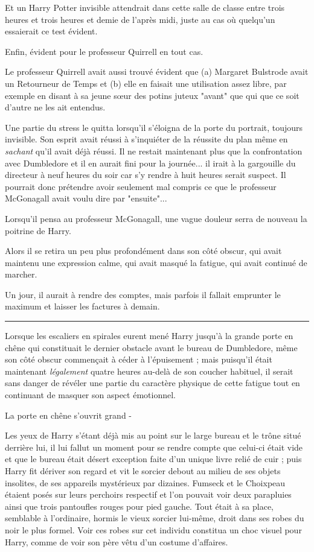 Et un Harry Potter invisible attendrait dans cette salle de classe entre trois heures et trois heures et demie de l'après midi, juste au cas où quelqu'un essaierait ce test évident.

Enfin, évident pour le professeur Quirrell en tout cas.

Le professeur Quirrell avait aussi trouvé évident que (a) Margaret Bulstrode avait un Retourneur de Temps et (b) elle en faisait une utilisation assez libre, par exemple en disant à sa jeune sœur des potins juteux "avant" que qui que ce soit d'autre ne les ait entendus.

Une partie du stress le quitta lorsqu'il s'éloigna de la porte du portrait, toujours invisible. Son esprit avait réussi à s'inquiéter de la réussite du plan même en \emph{sachant}  qu'il avait déjà réussi. Il ne restait maintenant plus que la confrontation avec Dumbledore et il en aurait fini pour la journée... il irait à la gargouille du directeur à neuf heures du soir car s'y rendre à huit heures serait suspect. Il pourrait donc prétendre avoir seulement mal compris ce que le professeur McGonagall avait voulu dire par "ensuite"...

Lorsqu'il pensa au professeur McGonagall, une vague douleur serra de nouveau la poitrine de Harry.

Alors il se retira un peu plus profondément dans son côté obscur, qui avait maintenu une expression calme, qui avait masqué la fatigue, qui avait continué de marcher.

Un jour, il aurait à rendre des comptes, mais parfois il fallait emprunter le maximum et laisser les factures à demain.
\par\noindent\rule{\textwidth}{0.4pt}
Lorsque les escaliers en spirales eurent mené Harry jusqu'à la grande porte en chêne qui constituait le dernier obstacle avant le bureau de Dumbledore, même son côté obscur commençait à céder à l'épuisement ; mais puisqu'il était maintenant \emph{légalement}  quatre heures au-delà de son coucher habituel, il serait sans danger de révéler une partie du caractère physique de cette fatigue tout en continuant de masquer son aspect émotionnel.

La porte en chêne s'ouvrit grand -

Les yeux de Harry s'étant déjà mis au point sur le large bureau et le trône situé derrière lui, il lui fallut un moment pour se rendre compte que celui-ci était vide et que le bureau était désert exception faite d'un unique livre relié de cuir ; puis Harry fit dériver son regard et vit le sorcier debout au milieu de ses objets insolites, de ses appareils mystérieux par dizaines. Fumseck et le Choixpeau étaient posés sur leurs perchoirs respectif et l'on pouvait voir deux parapluies ainsi que trois pantoufles rouges pour pied gauche. Tout était à sa place, semblable à l'ordinaire, hormis le vieux sorcier lui-même, droit dans ses robes du noir le plus formel. Voir ces robes sur cet individu constitua un choc visuel pour Harry, comme de voir son père vêtu d'un costume d'affaires.

